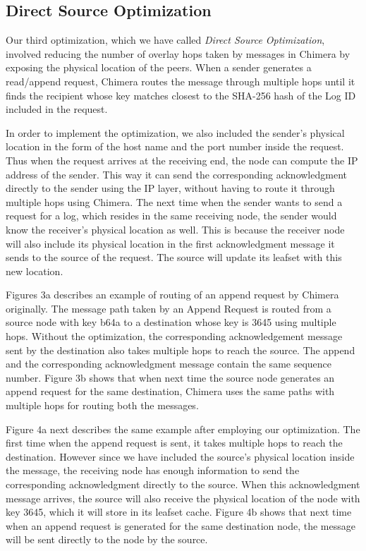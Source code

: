 \subsection{Direct Source Optimization}
Our third optimization, which we have called \textit{Direct Source Optimization}, involved reducing the number of overlay hops taken by messages in Chimera by exposing the physical location of the peers. When a sender generates a read/append request, Chimera routes the message through multiple hops until it finds the recipient whose key matches closest to the SHA-256 hash of the Log ID included in the request.
 
In order to implement the optimization, we also included the sender’s physical location in the form of the host name and the port number inside the request. Thus when the request arrives at the receiving end, the node can compute the IP address of the sender. This way it can send the corresponding acknowledgment directly to the sender using the IP layer, without having to route it through multiple hops using Chimera. The next time when the sender wants to send a request for a log, which resides in the same receiving node, the sender would know the receiver’s physical location as well. This is because the receiver node will also include its physical location in the first acknowledgment message it sends to the source of the request. The source will update its leafset with this new location.  
 
Figures 3a describes an example of routing of an append request by Chimera originally. The message path taken by an Append Request is routed from a source node with key b64a to a destination whose key is 3645 using multiple hops. Without the optimization, the corresponding acknowledgement message sent by the destination also takes multiple hops to reach the source. The append and the corresponding acknowledgment message contain the same sequence number. Figure 3b shows that when next time the source node generates an append request for the same destination, Chimera uses the same paths with multiple hops for routing both the messages.
 
Figure 4a next describes the same example after employing our optimization. The first time when the append request is sent, it takes multiple hops to reach the destination. However since we have included the source’s physical location inside the message, the receiving node has enough information to send the corresponding acknowledgment directly to the source. When this acknowledgment message arrives, the source will also receive the physical location of the node with key 3645, which it will store in its leafset cache. Figure 4b shows that next time when an append request is generated for the same destination node, the message will be sent directly to the node by the source.
 

